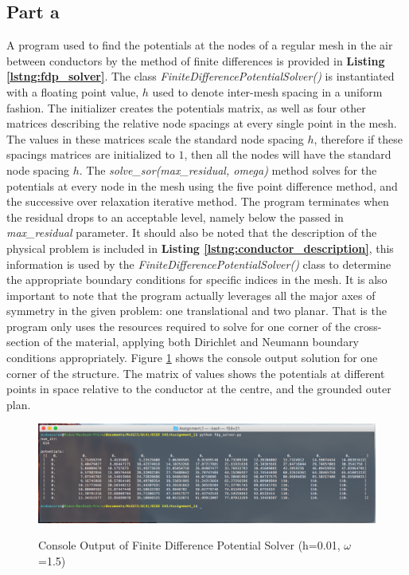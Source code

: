 \documentclass[11pt]{amsart}
\begin{document}
\subsection*{Part a}
A program used to find the potentials at the nodes of a regular mesh in the air between conductors by the method of finite differences is provided in \textbf{Listing \ref{lstng:fdp_solver}}. The class \textit{FiniteDifferencePotentialSolver()} is instantiated with a floating point value, $h$ used to denote inter-mesh spacing in a uniform fashion. The initializer creates the potentials matrix, as well as four other matrices describing the relative node spacings at every single point in the mesh. The values in these matrices scale the standard node spacing $h$, therefore if these spacings matrices are initialized to $1$, then all the nodes will have the standard node spacing $h$. The \textit{solve\_sor(max\_residual, omega)} method solves for the potentials at every node in the mesh using the five point difference method, and the successive over relaxation iterative method. The program terminates when the residual drops to an acceptable level, namely below the passed in \textit{max\_residual} parameter. It should also be noted that the description of the physical problem is included in \textbf{Listing \ref{lstng:conductor_description}}, this information is used by the \textit{FiniteDifferencePotentialSolver()} class to determine the appropriate boundary conditions for specific indices in the mesh. It is also important to note that the program actually leverages all the major axes of symmetry in the given problem: one translational and two planar. That is the program only uses the resources required to solve for one corner of the cross-section of the material, applying both Dirichlet and Neumann boundary conditions appropriately. Figure \ref{fig:fdp_solver} shows the console output solution for one corner of the structure. The matrix of values shows the potentials at different points in space relative to the conductor at the centre, and the grounded outer plan.

\begin{center}
	\begin{figure}[h]
		\caption{Console Output of Finite Difference Potential Solver (h=0.01, $\omega$=1.5)}
		\includegraphics[width=\textwidth]{assets/test_fdp_solver.png}\label{fig:fdp_solver}
	\end{figure}
\end{center}
\end{document}
